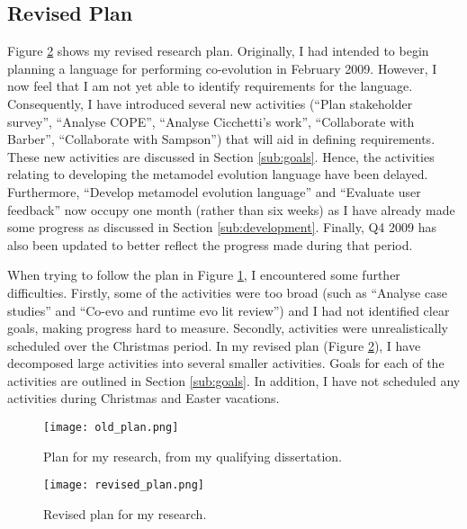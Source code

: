 \subsection{Revised Plan}
\label{sub:revised_plan}
Figure \ref{fig:revised_plan} shows my revised research plan. Originally, I had intended to begin planning a language for performing co-evolution in February 2009. However, I now feel that I am not yet able to identify requirements for the language. Consequently, I have introduced several new activities (``Plan stakeholder survey'', ``Analyse COPE'', ``Analyse Cicchetti's work'', ``Collaborate with Barber'', ``Collaborate with Sampson'') that will aid in defining requirements. These new activities are discussed in Section \ref{sub:goals}. Hence, the activities relating to developing the metamodel evolution language have been delayed. Furthermore, ``Develop metamodel evolution language'' and ``Evaluate user feedback'' now occupy one month (rather than six weeks) as I have already made some progress as discussed in Section \ref{sub:development}. Finally, Q4 2009 has also been updated to better reflect the progress made during that period.


When trying to follow the plan in Figure \ref{fig:old_plan}, I encountered some further difficulties. Firstly, some of the activities were too broad (such as ``Analyse case studies'' and ``Co-evo and runtime evo lit review'') and I had not identified clear goals, making progress hard to measure. Secondly, activities were unrealistically scheduled over the Christmas period.  In my revised plan (Figure \ref{fig:revised_plan}), I have decomposed large activities into several smaller activities. Goals for each of the activities are outlined in Section \ref{sub:goals}. In addition, I have not scheduled any activities during Christmas and Easter vacations.

\begin{landscape}

\begin{figure}[ht]
  \begin{center}
    \leavevmode
    \texttt{[image: old\_plan.png]}
  \end{center}
  \caption{Plan for my research, from my qualifying dissertation.}
  \label{fig:old_plan}
\end{figure}

\begin{figure}[ht]
  \begin{center}
    \leavevmode
    \texttt{[image: revised\_plan.png]}
  \end{center}
  \caption{Revised plan for my research.}
  \label{fig:revised_plan}
\end{figure}

\end{landscape}



